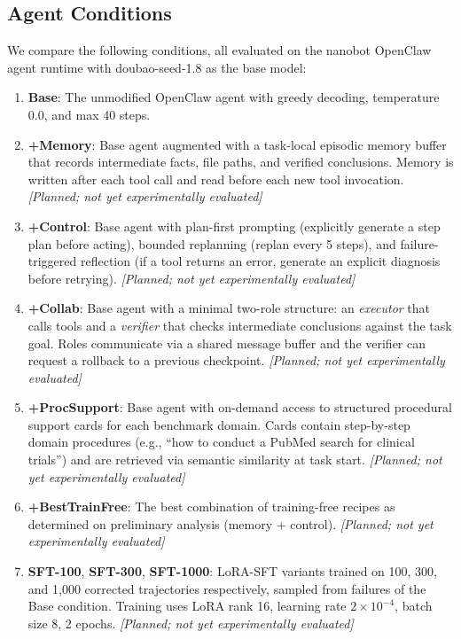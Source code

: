 
\subsection{Agent Conditions}
\label{sec:harness:conditions}

We compare the following conditions, all evaluated on the nanobot OpenClaw agent runtime with doubao-seed-1.8 as the base model:

\begin{enumerate}[leftmargin=2em, label=(\alph*), itemsep=0pt, parsep=0pt]

  \item \textbf{Base}: The unmodified OpenClaw agent with greedy decoding, temperature 0.0, and max 40 steps.

  \item \textbf{+Memory}: Base agent augmented with a task-local episodic memory buffer that records intermediate facts, file paths, and verified conclusions. Memory is written after each tool call and read before each new tool invocation. \emph{[Planned; not yet experimentally evaluated]}

  \item \textbf{+Control}: Base agent with plan-first prompting (explicitly generate a step plan before acting), bounded replanning (replan every 5 steps), and failure-triggered reflection (if a tool returns an error, generate an explicit diagnosis before retrying). \emph{[Planned; not yet experimentally evaluated]}

  \item \textbf{+Collab}: Base agent with a minimal two-role structure: an \emph{executor} that calls tools and a \emph{verifier} that checks intermediate conclusions against the task goal. Roles communicate via a shared message buffer and the verifier can request a rollback to a previous checkpoint. \emph{[Planned; not yet experimentally evaluated]}

  \item \textbf{+ProcSupport}: Base agent with on-demand access to structured procedural support cards for each benchmark domain. Cards contain step-by-step domain procedures (e.g., ``how to conduct a PubMed search for clinical trials'') and are retrieved via semantic similarity at task start. \emph{[Planned; not yet experimentally evaluated]}

  \item \textbf{+BestTrainFree}: The best combination of training-free recipes as determined on preliminary analysis (memory + control). \emph{[Planned; not yet experimentally evaluated]}

  \item \textbf{SFT-100}, \textbf{SFT-300}, \textbf{SFT-1000}: LoRA-SFT variants trained on 100, 300, and 1,000 corrected trajectories respectively, sampled from failures of the Base condition. Training uses LoRA rank 16, learning rate $2\times10^{-4}$, batch size 8, 2 epochs. \emph{[Planned; not yet experimentally evaluated]}

\end{enumerate}

